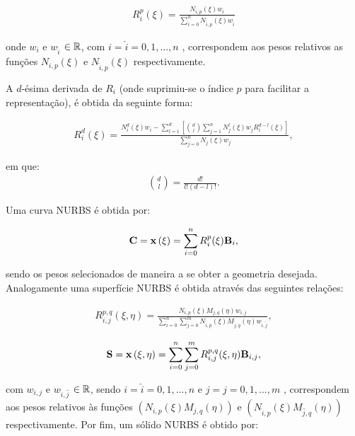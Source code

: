 \documentclass[tese_patricia]{subfiles}
\begin{document}
\begin{align}
R_{i}^{p}(\xi) = \frac{N_{i,p}(\xi)w_i}{\sum_{\hat{i}=0}^{n}N_{\hat{i},p}(\xi)w_{\hat{i}}}
\end{align}

\noindent onde $w_i$ e $w_{\hat{i}}$ $\in \mathbb{R}$, com $i = \hat{i} =  0, 1, ... , n$ , correspondem aos pesos relativos as funções $N_{i,p}\left(\xi\right)$ e $N_{\hat{i},p}\left(\xi\right)$ respectivamente. 

A $d$-ésima derivada de $R_{i}$ (onde suprimiu-se o índice $p$ para facilitar a representação), é obtida da seguinte forma:

\begin{align}
R_{i}^{d}(\xi) = \frac{N_{i}^{d}(\xi)w_i - \sum_{l=1}^{d}\left[\binom{d}{l}\sum_{j=1}^{n}N_{j}^{l}(\xi)w_{j}R_{i}^{d-l}(\xi)\right]}{\sum_{{j}=0}^{n}N_{{j}}(\xi)w_{{j}}},
\end{align}

\noindent em que:
\begin{align}
\binom{d}{l} = \frac{d!}{l!\left(d-l\right)!}.
\end{align}

Uma curva NURBS é obtida por:

\begin{align}
\mathbf{C} = \mathbf{x}\left(\xi\right) = \sum_{i=0}^{n}R_{i}^{p}(\xi)\mathbf{B}_i, \label{eq:curveNURBS}
\end{align}

\noindent sendo os pesos selecionados de maneira a se obter a geometria desejada. Analogamente uma superfície NURBS é obtida através das seguintes relações:

\begin{align}
R_{i,j}^{p,q}(\xi,\eta) = \frac{N_{i,p}(\xi)M_{j,q}(\eta)w_{i,j}}{\sum_{\hat{i}=0}^{n}\sum_{\hat{j}=0}^{m}N_{\hat{i},p}(\xi)M_{\hat{j},q}(\eta)w_{\hat{i},\hat{j}}},
\end{align}

\begin{align}
\mathbf{S} = \mathbf{x}\left(\xi,\eta\right) = \sum_{i=0}^{n}\sum_{j=0}^{m}R_{i,j}^{p,q}(\xi,\eta)\mathbf{B}_{i,j}, \label{eq:surfaceNURBS}
\end{align}

\noindent com $w_{i,j}$ e $w_{\hat{i},\hat{j}}$ $\in \mathbb{R}$, sendo $i = \hat{i} =  0, 1, ... , n$ e  $j = \hat{j} =  0, 1, ... , m$ , correspondem aos pesos relativos às funções $\left(N_{i,p}\left(\xi\right)M_{j,q}\left(\eta\right)\right)$ e $\left(N_{\hat{i},p}\left(\xi\right)M_{\hat{j},q}\left(\eta\right)\right)$ respectivamente. Por fim, um sólido NURBS é obtido por:
\end{document}
